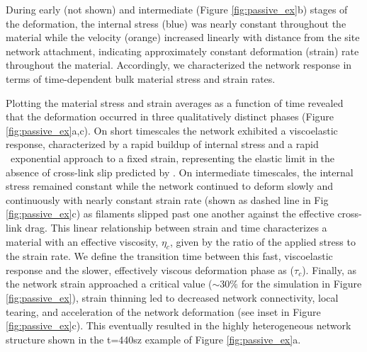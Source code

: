 \documentclass[10pt,letterpaper]{article}
\begin{document}
During early (not shown) and intermediate (Figure \ref{fig:passive_ex}b) stages of the deformation, the internal stress (blue) was nearly constant throughout the material while the velocity (orange) increased linearly with distance from the site network attachment, indicating approximately constant deformation (strain) rate throughout the material.  Accordingly, we characterized the network response in terms of time-dependent bulk material stress and strain rates.

Plotting the material stress and strain averages as a function of time revealed that the deformation occurred in three qualitatively distinct phases (Figure \ref{fig:passive_ex}a,c). On short timescales the network exhibited a viscoelastic response, characterized by a rapid buildup of internal stress and a rapid ~exponential approach to a fixed strain, representing the elastic limit in the absence of cross-link slip predicted by  \cite{theo_hlm}. On intermediate timescales, the internal stress remained constant while the network continued to deform slowly and continuously with nearly constant strain rate (shown as dashed line in Fig \ref{fig:passive_ex}c) as filaments slipped past one another against the effective cross-link drag. This linear relationship between strain and time characterizes a material with an effective viscosity, $\eta_c$, given by the ratio of the applied stress to the strain rate.  We define the transition time between this fast, viscoelastic response and the slower, effectively viscous deformation phase as ($\tau_c$).  Finally, as the network strain approached a critical value ($\sim 30\%$ for the simulation in Figure \ref{fig:passive_ex}), strain thinning led to decreased network connectivity, local tearing, and acceleration of the network deformation (see inset in Figure \ref{fig:passive_ex}c). This eventually resulted in the highly heterogeneous network structure shown in the t=440sz example of Figure \ref{fig:passive_ex}a. 
\end{document}
